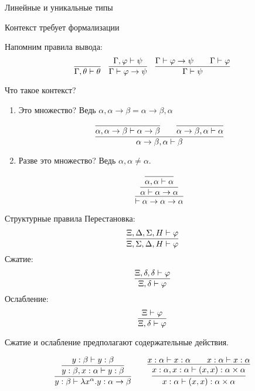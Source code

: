 \documentclass[aspectratio=169,dvipsnames,usenames]{beamer}
\begin{document}
\newtheorem{dfn}{Определение}[section]
\newtheorem{nte}{Замечание}[section]

\newtheorem{axiom}{Аксиома}[section]
\newtheorem{thm}{Теорема}[section]
\newtheorem{lmm}[theorem]{Лемма}
\newtheorem{statement}{Утверждение}[section]
\newtheorem{oun_paragraph}{Пункт}[section]
\newtheorem{cons}{Следствие}[section]
\newtheorem*{exm}{Пример}

\newcommand{\comb}[1]{\operatorname{\mathcal{#1}}}
\newcommand{\func}[1]{\operatorname{#1}}
\newcommand{\reduction}[1]{{\color{OrangeRed}#1}}
\newcommand{\set}[1]{\left\{#1\right\}}

\def\from#1{\par \parbox{0.7\textwidth}{\par \hfill\raggedleft \it #1}} 

\begin{frame}{}
\begin{center}
{\LARGE Линейные и уникальные типы}
\end{center}
\end{frame}

\begin{frame}{Контекст требует формализации}

Напомним правила вывода:
	$$\infer{\Gamma, \theta \vdash \theta}{}
		\quad\infer{\Gamma \vdash \varphi \rightarrow \psi}{\Gamma, \varphi \vdash \psi}\quad
		\infer{\Gamma \vdash \psi}{\Gamma \vdash \varphi \to \psi && \Gamma \vdash \varphi}$$
	

Что такое контекст?
\begin{enumerate}
\item Это множество? Ведь $\alpha, \alpha\rightarrow\beta = \alpha\rightarrow\beta,\alpha$

	$$\infer{\alpha\rightarrow\beta, \alpha \vdash \beta}
                {\infer{\alpha, \alpha\rightarrow\beta \vdash \alpha\rightarrow\beta}{}\quad\quad\infer{ \alpha\rightarrow\beta,\alpha \vdash  \alpha}{}}$$
\item Разве это множество? Ведь $\alpha,\alpha \ne \alpha$.

	$$\infer{\vdash\alpha\rightarrow\alpha\rightarrow\alpha}{\infer{\alpha\vdash\alpha\rightarrow\alpha}{\infer{\alpha,\alpha\vdash\alpha}{}}}$$
\end{enumerate}

\end{frame}

\begin{frame}{Структурные правила}
Перестановка:
$$\infer{\Xi,\Sigma,\Delta,H\vdash\varphi}{\Xi,\Delta,\Sigma,H\vdash\varphi}$$
Сжатие:
$$\infer{\Xi,\delta\vdash\varphi}{\Xi,\delta,\delta\vdash\varphi}$$
Ослабление:
$$\infer{\Xi,\delta\vdash\varphi}{\Xi\vdash\varphi}$$

Сжатие и ослабление предполагают содержательные действия.

$$\infer{y:\beta\vdash\lambda x^\alpha.y : \alpha\rightarrow\beta}{\infer{y:\beta,x:\alpha\vdash y : \beta}{y:\beta\vdash y : \beta}}\quad\quad
  \infer{x:\alpha\vdash ( x,x ) : \alpha\times\alpha}{\infer{x:\alpha,x:\alpha\vdash ( x,x ) : \alpha \times \alpha}{x:\alpha\vdash x:\alpha\quad\quad x:\alpha\vdash x:\alpha}}$$
\end{frame}
\end{document}
